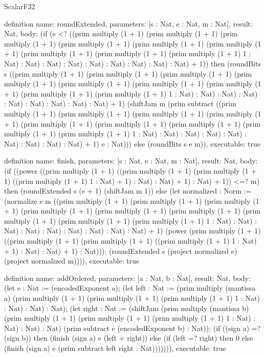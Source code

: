 \begin{lexlean}{ScalarF32}
\begin{semanticmodule}
definition{
  name: roundExtended,
  parameters: [s : Nat, e : Nat, m : Nat],
  result: Nat,
  body: (if (e <? ((prim multiply (1 + 1) (prim multiply (1 + 1) (prim multiply (1 + 1) (prim multiply (1 + 1) (prim multiply (1 + 1) (prim multiply (1 + 1) (prim multiply (1 + 1) (prim multiply (1 + 1) (prim multiply (1 + 1) 1 : Nat) : Nat) : Nat) : Nat) : Nat) : Nat) : Nat) : Nat) : Nat) + 1)) then (roundBits s ((prim multiply (1 + 1) (prim multiply (1 + 1) (prim multiply (1 + 1) (prim multiply (1 + 1) (prim multiply (1 + 1) (prim multiply (1 + 1) (prim multiply (1 + 1) (prim multiply (1 + 1) (prim multiply (1 + 1) 1 : Nat) : Nat) : Nat) : Nat) : Nat) : Nat) : Nat) : Nat) : Nat) + 1) (shiftJam m (prim subtract ((prim multiply (1 + 1) (prim multiply (1 + 1) (prim multiply (1 + 1) (prim multiply (1 + 1) (prim multiply (1 + 1) (prim multiply (1 + 1) (prim multiply (1 + 1) (prim multiply (1 + 1) (prim multiply (1 + 1) 1 : Nat) : Nat) : Nat) : Nat) : Nat) : Nat) : Nat) : Nat) : Nat) + 1) e : Nat))) else (roundBits s e m)),
  executable: true
}

definition{
  name: finish,
  parameters: [s : Nat, e : Nat, m : Nat],
  result: Nat,
  body: (if ((power ((prim multiply (1 + 1) ((prim multiply (1 + 1) (prim multiply (1 + 1) ((prim multiply (1 + 1) 1 : Nat) + 1) : Nat) : Nat) + 1) : Nat) + 1)) <=? m) then (roundExtended s (e + 1) (shiftJam m 1)) else (let normalized : Norm := (normalize e m ((prim multiply (1 + 1) (prim multiply (1 + 1) (prim multiply (1 + 1) (prim multiply (1 + 1) (prim multiply (1 + 1) (prim multiply (1 + 1) (prim multiply (1 + 1) (prim multiply (1 + 1) (prim multiply (1 + 1) 1 : Nat) : Nat) : Nat) : Nat) : Nat) : Nat) : Nat) : Nat) : Nat) + 1) (power (prim multiply (1 + 1) ((prim multiply (1 + 1) (prim multiply (1 + 1) ((prim multiply (1 + 1) 1 : Nat) + 1) : Nat) : Nat) + 1) : Nat))); (roundExtended s (project normalized e) (project normalized m)))),
  executable: true
}

definition{
  name: addOrdered,
  parameters: [a : Nat, b : Nat],
  result: Nat,
  body: (let e : Nat := (encodedExponent a); (let left : Nat := (prim multiply (mantissa a) (prim multiply (1 + 1) (prim multiply (1 + 1) (prim multiply (1 + 1) 1 : Nat) : Nat) : Nat) : Nat); (let right : Nat := (shiftJam (prim multiply (mantissa b) (prim multiply (1 + 1) (prim multiply (1 + 1) (prim multiply (1 + 1) 1 : Nat) : Nat) : Nat) : Nat) (prim subtract e (encodedExponent b) : Nat)); (if ((sign a) =? (sign b)) then (finish (sign a) e (left + right)) else (if (left =? right) then 0 else (finish (sign a) e (prim subtract left right : Nat))))))),
  executable: true
}


\end{semanticmodule}
\end{lexlean}

